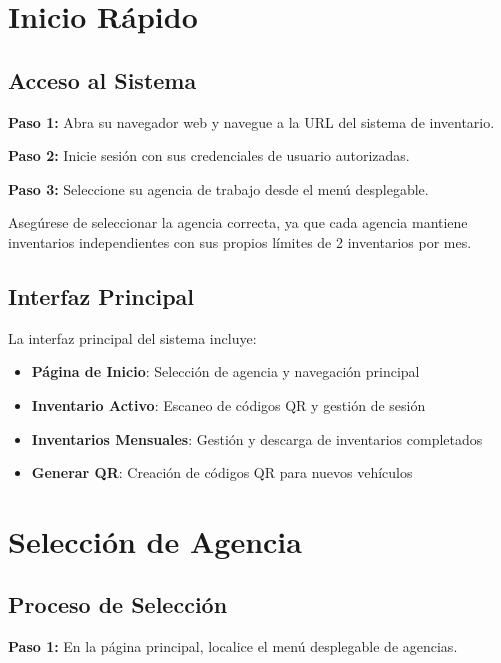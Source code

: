 \documentclass[11pt,a4paper]{article}
\newcommand{\step}[1]{\textbf{\color{primarytext}Paso #1:}}
\begin{document}
\section{Inicio Rápido}

\subsection{Acceso al Sistema}

\step{1} Abra su navegador web y navegue a la URL del sistema de inventario.

\step{2} Inicie sesión con sus credenciales de usuario autorizadas.

\step{3} Seleccione su agencia de trabajo desde el menú desplegable.

\begin{warningbox}[Importante]
Asegúrese de seleccionar la agencia correcta, ya que cada agencia mantiene inventarios independientes con sus propios límites de 2 inventarios por mes.
\end{warningbox}

\subsection{Interfaz Principal}

La interfaz principal del sistema incluye:

\begin{itemize}
    \item \textbf{Página de Inicio}: Selección de agencia y navegación principal
    \item \textbf{Inventario Activo}: Escaneo de códigos QR y gestión de sesión
    \item \textbf{Inventarios Mensuales}: Gestión y descarga de inventarios completados
    \item \textbf{Generar QR}: Creación de códigos QR para nuevos vehículos
\end{itemize}

\section{Selección de Agencia}

\subsection{Proceso de Selección}

\step{1} En la página principal, localice el menú desplegable de agencias.
\end{document}
